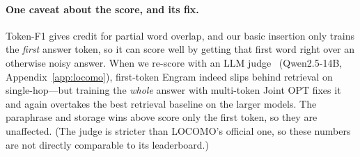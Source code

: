 \documentclass[letterpaper]{article} %
\begin{document}
\begin{table}[t]
  \centering
  \caption{LOCOMO category $\times$ model token-F1. Engram Joint OPT vs.\
  the best retrieval baseline (MEM0\_LIKE or MEMMACHINE\_LIKE)
  per cell. The Engram win is category-dependent
  (Figure~\ref{fig:locomo-categories}).}
  \label{tab:locomo-categories}
\end{table}

\paragraph{One caveat about the score, and its fix.} Token-F1 gives
credit for partial word overlap, and our basic insertion only trains
the \emph{first} answer token, so it can score well by getting that
first word right over an otherwise noisy answer. When we re-score
with an LLM judge~\citep{zheng2023mtbench} (Qwen2.5-14B,
Appendix~\ref{app:locomo}), first-token
Engram indeed slips behind retrieval on single-hop---but training the
\emph{whole} answer with multi-token Joint OPT fixes it and again
overtakes the best retrieval baseline on the larger models. The
paraphrase and storage wins above score only the first token, so they
are unaffected. (The judge is stricter than LOCOMO's official one, so
these numbers are not directly comparable to its leaderboard.)
\end{document}
